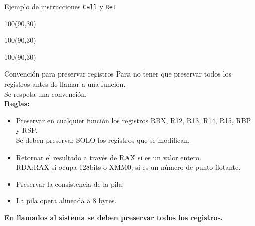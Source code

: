\documentclass[aspectratio=169]{beamer}
\begin{document}
\begin{frame}[fragile]{Ejemplo de instrucciones \texttt{Call} y \texttt{Ret}}
    \begin{textblock}{100}(90,30)   \end{textblock} %
    \begin{textblock}{100}(90,30)   \end{textblock} %
    \begin{textblock}{100}(90,30)   \end{textblock} %
\end{frame}

\begin{frame}[fragile]{Convención para preservar registros}
    Para no tener que preservar todos los registros antes de llamar a una función.\\
    Se respeta una convención.\\
    \bigskip
    \textbf{Reglas:}\\
    \begin{itemize}
    \setlength\itemsep{0.3cm}
     \item Preservar en cualquier función los registros RBX, R12, R13, R14, R15, RBP y RSP.\\
    {\scriptsize Se deben preservar SOLO los registros que se modifican.}
    \item Retornar el resultado a través de RAX si es un valor entero.\\
    {\scriptsize RDX:RAX si ocupa 128bits o XMM0, si es un número de punto flotante.}
    \item Preservar la consistencia de la pila.
    \item La pila opera alineada a 8 bytes.
    \end{itemize}
    \vspace{0.3cm}
    \textcolor{verdeuca}{\textbf{En llamados al sistema se deben preservar todos los registros.}}
\end{frame}
\end{document}
